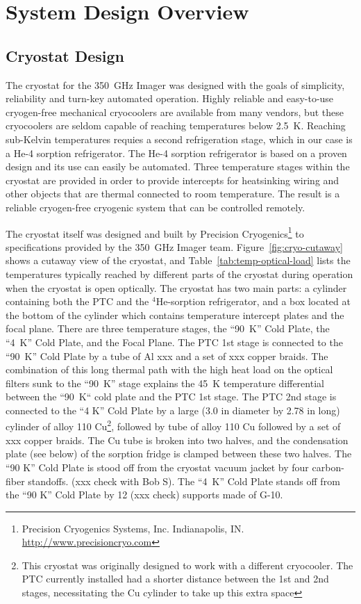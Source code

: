 \documentclass[10pt,twocolumn,article]{memoir}
\newcommand*{\figref}[1]{Figure~\ref{#1}}
\newcommand*{\tableref}[1]{Table~\ref{#1}}
\newcommand*{\He}[1]{$^{#1}$He\xspace}
\begin{document}
\chapter{System Design Overview}\label{c:sys-design}

\section{Cryostat Design}\label{s-cryo-design}

The cryostat for the 350~GHz Imager was designed with the goals of simplicity, reliability and turn-key automated operation.
Highly reliable and easy-to-use cryogen-free mechanical cryocoolers are available from many vendors, but these cryocoolers are seldom capable of reaching temperatures below 2.5~K.
Reaching sub-Kelvin temperatures requies a second refrigeration stage, which in our case is a He-4 sorption refrigerator.
The He-4 sorption refrigerator is based on a proven design and its use can easily be automated.
Three temperature stages within the cryostat are provided in order to provide intercepts for heatsinking wiring and other objects that are thermal connected to room temperature. 
The result is a reliable cryogen-free cryogenic system that can be controlled remotely.

The cryostat itself was designed and built by Precision Cryogenics\footnote{Precision Cryogenics Systems, Inc. Indianapolis, IN. \url{http://www.precisioncryo.com}} to specifications provided by the 350~GHz Imager team.
\figref{fig:cryo-cutaway} shows a cutaway view of the cryostat, and \tableref{tab:temp-optical-load} lists the temperatures typically reached by different parts of the cryostat during operation when the cryostat is open optically.
The cryostat has two main parts: a cylinder containing both the PTC and the \He4-sorption refrigerator, and a box located at the bottom of the cylinder which contains temperature intercept plates and the focal plane.
There are three temperature stages, the ``90~K'' Cold Plate, the ``4~K'' Cold Plate, and the Focal Plane.
The PTC 1st stage is connected to the ``90~K'' Cold Plate by a tube of Al xxx and a set of xxx copper braids.
The combination of this long thermal path with the high heat load on the optical filters sunk to the ``90~K'' stage explains the 45~K temperature differential between the ``90~K`` cold plate and the PTC 1st stage.
The PTC 2nd stage is connected to the ``4 K'' Cold Plate by a large (3.0 in diameter by 2.78 in long) cylinder of alloy 110 Cu\footnote{This cryostat was originally designed to work with a different cryocooler. The PTC currently installed had a shorter distance between the 1st and 2nd stages, necessitating the Cu cylinder to take up this extra space}, followed by tube of alloy 110 Cu followed by a set of xxx copper braids.
The Cu tube is broken into two halves, and the condensation plate (see below) of the sorption fridge is clamped between these two halves. The ``90 K'' Cold Plate is stood off from the cryostat vacuum jacket by four carbon-fiber standoffs. (xxx check with Bob S). The ``4~K'' Cold Plate stands off from the ``90 K'' Cold Plate by 12 (xxx check) supports made of G-10.
\end{document}

